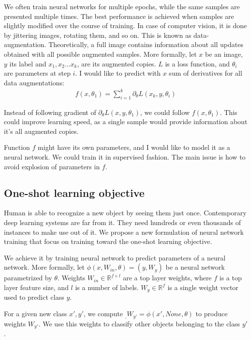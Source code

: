 \documentclass{article}
\begin{document}
We often train neural networks for multiple epochs, while the same 
samples are presented multiple times. The best performance is
achieved when samples are slightly modified over the course of training.
In case of computer vision, it is done by jittering images, rotating
them, and so on. This is known as data-augmentation. 
Theoretically, a full image contains information about all updates obtained
with all possible augmented samples. More formally, let $x$ be an image, $y$ its label and
$x_1, x_2 \dots x_k$, are its augmented copies. $L$ is a loss function, and $\theta_i$ are parameters at step $i$.
I would like to
predict with $x$ sum of derivatives for all data augmentations:
\begin{align}
f(x, \theta_1) = \sum_{i=1}^k \partial_\theta L(x_k, y, \theta_i)
\end{align}

Instead of following gradient of $\partial_\theta L(x, y, \theta_1)$, we could
follow $f(x, \theta_1)$.
This could improve learning speed, as a single sample would provide
information about it's all augmented copies. 


Function $f$ might have its own parameters, and I would like to model it 
as a neural network. We could train it in supervised fashion. The main issue
is how to avoid explosion of parameters in $f$. 


\subsection{One-shot learning objective}
Human is able to recognize a new object by seeing them just once.
Contemporary deep learning systems are far from it. They need hundreds or
even thousands of instances to make use out of it. 
We propose a new formulation of neural network training that focus on training
toward the one-shot learning objective. 


We achieve it by training neural network to predict parameters of a neural network. 
More formally, let $\phi(x, W_{in}, \theta) = (y, W_{y})$ be a neural network parametrized
by $\theta$. Weights $W_{in} \in \mathbb{R}^{f \times l}$ are a top layer weights, where
$f$ is a top layer feature size, and $l$ is a number of labels. $W_{y} \in \mathbb{R}^f$ is a
single weight vector used to predict class $y$.



For a given new class $x', y'$, we compute $_, W_{y'} = \phi(x', None, \theta)$ to produce weights $W_{y'}$. 
We use this weights to classify
other objects belonging to the class $y'$.
\end{document}
